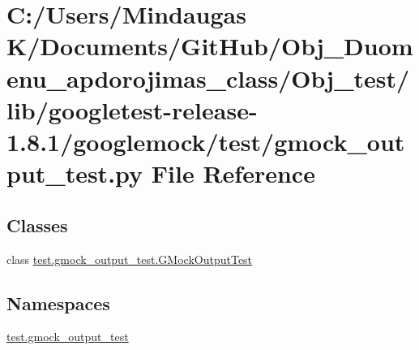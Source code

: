 \hypertarget{_obj__test_2lib_2googletest-release-1_88_81_2googlemock_2test_2gmock__output__test_8py}{}\section{C\+:/\+Users/\+Mindaugas K/\+Documents/\+Git\+Hub/\+Obj\+\_\+\+Duomenu\+\_\+apdorojimas\+\_\+class/\+Obj\+\_\+test/lib/googletest-\/release-\/1.8.1/googlemock/test/gmock\+\_\+output\+\_\+test.py File Reference}
\label{_obj__test_2lib_2googletest-release-1_88_81_2googlemock_2test_2gmock__output__test_8py}
\subsection*{Classes}
\begin{DoxyCompactItemize}
\item 
class \mbox{\hyperlink{classtest_1_1gmock__output__test_1_1_g_mock_output_test}{test.\+gmock\+\_\+output\+\_\+test.\+G\+Mock\+Output\+Test}}
\end{DoxyCompactItemize}
\subsection*{Namespaces}
\begin{DoxyCompactItemize}
\item 
 \mbox{\hyperlink{namespacetest_1_1gmock__output__test}{test.\+gmock\+\_\+output\+\_\+test}}
\end{DoxyCompactItemize}
